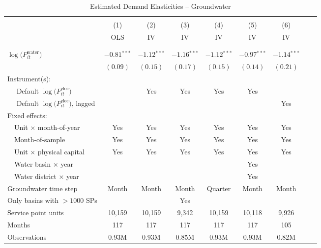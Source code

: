 \begin{table}[t!]\centering
\small
\caption{Estimated Demand Elasticities -- Groundwater  \label{tab:water_regs_combined}}
\vspace{-0.1cm}
\small
\begin{adjustbox}{center} 
\begin{tabular}{lcccccccc} 
\hline \hline
\vspace{-0.37cm}
\\
 & (1)  & (2)  & (3)  & (4)  & (5)  & (6) \\ 
[0.1em]
 & OLS & IV & IV & IV & IV & IV \\
\vspace{-0.37cm}
\\
\cline{2-7}
\vspace{-0.27cm}
\\
 $\log\big(P^{\text{water}}_{it}\big)$ ~ & 
 $-0.81$$^{***}$  & $-1.12$$^{***}$ & $-1.16$$^{***}$ & $-1.12$$^{***}$ & $-0.97$$^{***}$  & $-1.14$$^{***}$ \\ 
& $(0.09)$ & $(0.15)$ & $(0.17)$ & $(0.15)$ & $(0.14)$ & $(0.21)$ \\
[1.5em] 
Instrument(s): \\
[0.1em] 
~~ Default $\log\big(P^{\text{elec}}_{it}\big)$  &  & Yes & Yes  & Yes  & Yes & \\
[0.1em] 
~~ Default $\log\big(P^{\text{elec}}_{it}\big)$, lagged  & & &  &  & & Yes \\
[1.5em] 
Fixed effects: \\
[0.1em] 
~~Unit $\times$ month-of-year  & Yes  & Yes  & Yes  & Yes  & Yes  & Yes   \\ 
[0.1em] 
~~Month-of-sample  & Yes  & Yes  & Yes  & Yes  & Yes  & Yes   \\ 
[0.1em] 
~~Unit $\times$ physical capital & Yes & Yes & Yes & Yes & Yes & Yes  \\
[0.1em] 
~~Water basin $\times$ year & & &  & & Yes &   \\
[0.1em] 
~~Water district $\times$ year & & & & & Yes &  \\
[1.5em] 
Groundwater time step & Month & Month & Month & Quarter & Month & Month  \\ 
[0.1em] 
Only basins with $>1000$ SPs &  &  & Yes &  &  &   \\ 
[1.5em] 
Service point units & 10,159 & 10,159 & 9,342 & 10,159 & 10,118 & 9,926  \\ 
[0.1em] 
Months  & 117 & 117 & 117 & 117 & 117 & 105 \\ 
[0.1em] 
Observations & 0.93M & 0.93M & 0.85M & 0.93M & 0.93M & 0.82M \\ 

\end{tabular}
\end{adjustbox}
\end{table}
